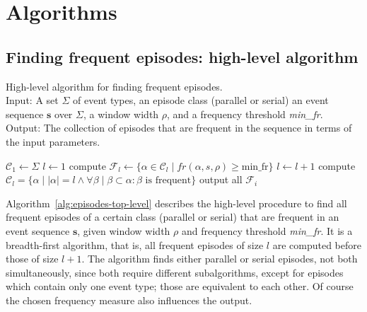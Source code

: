 \chapter{Algorithms}
\label{sec:algorithms}

\section{Finding frequent episodes: high-level algorithm}

\begin{algorithm}

\caption{High-level algorithm for finding frequent episodes. \\
Input: A set $ \Sigma $ of event types, an episode class (parallel or serial) an event sequence $ \boldsymbol{s} $ over $ \Sigma $, a window width $ \rho $, and a frequency threshold \emph{min\_fr}. \\
Output: The collection of episodes that are frequent in the sequence in terms of the input parameters.
}

\begin{algorithmic}[1]

\State $ \mathcal{C}_1 \gets \Sigma $
\State $ l \gets 1 $
    \State compute $ \mathcal{F}_l \gets \{ \alpha \in \mathcal{C}_l \mid fr(\alpha, s, \rho) \geq \text{min\_fr} \} $
    \State $ l \gets l + 1 $
    \State compute $ \mathcal{C}_l = \{ \alpha \mid | \alpha | = l \wedge \forall \beta \mid \beta \subset \alpha : \beta \text{ is frequent} \} $
\EndWhile
\State output all $ \mathcal{F}_i $

\end{algorithmic}

\label{alg:episodes-top-level}
\end{algorithm}


Algorithm~\ref{alg:episodes-top-level} describes the high-level procedure to find all frequent episodes of a certain class (parallel or serial) that are frequent in an event sequence $ \boldsymbol{s} $, given window width $ \rho $ and frequency threshold \emph{min\_fr}. It is a breadth-first algorithm, that is, all frequent episodes of size $ l $ are computed before those of size $ l + 1 $. The algorithm finds either parallel or serial episodes, not both simultaneously, since both require different subalgorithms, except for episodes which contain only one event type; those are equivalent to each other. Of course the chosen frequency measure also influences the output.

